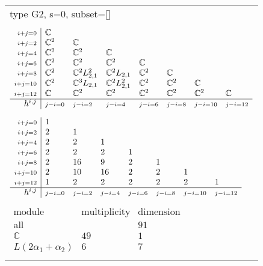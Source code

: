 \documentclass[crop,border=2mm]{standalone}
\begin{document}
\begin{tabular}{l}
{\huge type G2, s=0, subset=[]}\\ \\


$\displaystyle
\begin{array}{r|l l l l l l l}
	{\scriptstyle i+j=0}&\mathbb{C}&&&&&&\\
	{\scriptstyle i+j=2}&\mathbb{C}^{2}&\mathbb{C}&&&&&\\
	{\scriptstyle i+j=4}&\mathbb{C}^{2}&\mathbb{C}^{2}&\mathbb{C}&&&&\\
	{\scriptstyle i+j=6}&\mathbb{C}^{2}&\mathbb{C}^{2}&\mathbb{C}^{2}&\mathbb{C}&&&\\
	{\scriptstyle i+j=8}&\mathbb{C}^{2}&\mathbb{C}^{2}L_{2,1}^{2}&\mathbb{C}^{2}L_{2,1}&\mathbb{C}^{2}&\mathbb{C}&&\\
	{\scriptstyle i+j=10}&\mathbb{C}^{2}&\mathbb{C}^{3}L_{2,1}&\mathbb{C}^{2}L_{2,1}^{2}&\mathbb{C}^{2}&\mathbb{C}^{2}&\mathbb{C}&\\
	{\scriptstyle i+j=12}&\mathbb{C}&\mathbb{C}^{2}&\mathbb{C}^{2}&\mathbb{C}^{2}&\mathbb{C}^{2}&\mathbb{C}^{2}&\mathbb{C}\\
	\hline h^{i,j}&{\scriptstyle j-i=0}&{\scriptstyle j-i=2}&{\scriptstyle j-i=4}&{\scriptstyle j-i=6}&{\scriptstyle j-i=8}&{\scriptstyle j-i=10}&{\scriptstyle j-i=12}
\end{array}
$ \\ \\


$\displaystyle
\begin{array}{r|l l l l l l l}
	{\scriptstyle i+j=0}&1&&&&&&\\
	{\scriptstyle i+j=2}&2&1&&&&&\\
	{\scriptstyle i+j=4}&2&2&1&&&&\\
	{\scriptstyle i+j=6}&2&2&2&1&&&\\
	{\scriptstyle i+j=8}&2&16&9&2&1&&\\
	{\scriptstyle i+j=10}&2&10&16&2&2&1&\\
	{\scriptstyle i+j=12}&1&2&2&2&2&2&1\\
	\hline h^{i,j}&{\scriptstyle j-i=0}&{\scriptstyle j-i=2}&{\scriptstyle j-i=4}&{\scriptstyle j-i=6}&{\scriptstyle j-i=8}&{\scriptstyle j-i=10}&{\scriptstyle j-i=12}
\end{array}
$ \\ \\


$\displaystyle
\begin{array}{rll}
	\text{module}&\text{multiplicity}&\text{dimension} \\ \hline \text{all}&&91 \\
	\mathbb{C}&49&1\\
	L\left( 2\alpha_{1}+\alpha_{2}\right)&6&7
\end{array}
$ \\ \\

\end{tabular}
\end{document}
